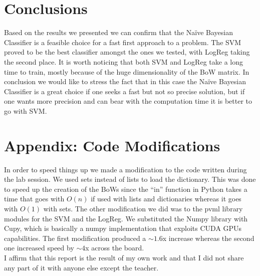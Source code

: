 \documentclass[10pt,a4paper]{report}
\begin{document}
\section{Conclusions}
Based on the results we presented we can confirm that the Na\"{i}ve Bayesian Classifier is a feasible choice for a fast first approach to a problem. The SVM proved to be the best classifier amongst the ones we tested, with LogReg taking the second place. It is worth noticing that both SVM and LogReg take a long time to train, mostly because of the huge dimensionality of the BoW matrix. In conclusion we would like to stress the fact that in this case the Na\"{i}ve Bayesian Classifier is a great choice if one seeks a fast but not so precise solution, but if one wants more precision and can bear with the computation time it is better to go with SVM. 
\section{Appendix: Code Modifications}
In order to speed things up we made a modification to the code written during the lab session. We used sets instead of lists to load the dictionary. This was done to speed up the creation of the BoWs since the \enquote{in} function in Python takes a time that goes with $O(n)$ if used with lists and dictionaries whereas it goes with $O(1)$ with sets. The other modification we did was to the pvml library modules for the SVM and the LogReg. We substituted the Numpy library with Cupy, which is basically a numpy implementation that exploits CUDA GPUs capabilities. The first modification produced a $\sim 1.6$x increase whereas the second one increased speed by $\sim 4$x across the board.
\vspace*{\fill}
\\
I affirm that this report is the result of my own work and that I did not share any part of it with anyone else except the teacher.
\\ \\ \\ \\ \\  
\end{document}
